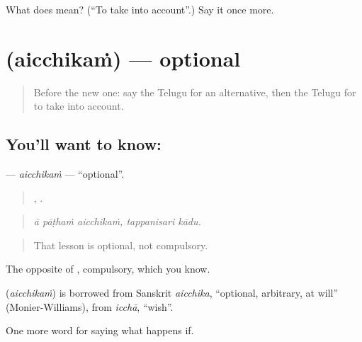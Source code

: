 \begin{tcolorbox}[breakable,colback=teal!4,colframe=teal!35!black,title={Before you move on}]
What does  mean? (\textquotedblleft{}To take into account\textquotedblright{}.) Say it once more.
\end{tcolorbox}
\section[\texorpdfstring{\te{ఐచ్ఛికం} (aicchikaṁ)}{ఐచ్ఛికం (aicchikaṁ)}]{ (aicchikaṁ) — optional}

\label{lesson:TE-C420-aicchikam}



\begin{quote}
Before the new one: say the Telugu for an alternative, then the Telugu for to take into account.
\end{quote}

\subsection*{You'll want to know: }
\textbf{} — \emph{aicchikaṁ} — \textquotedblleft{}optional\textquotedblright{}.

\begin{quote}
  ,  .
\end{quote}

\begin{quote}
\emph{ā pāṭhaṁ aicchikaṁ, tappanisari kādu.}
\end{quote}

\begin{quote}
That lesson is optional, not compulsory.
\end{quote}

The opposite of , compulsory, which you know.

\begin{cousinweb}
\textbf{} (\emph{aicchikaṁ}) is borrowed from Sanskrit \emph{aicchika}, \textquotedblleft{}optional, arbitrary, at will\textquotedblright{} (Monier-Williams), from \emph{icchā}, \textquotedblleft{}wish\textquotedblright{}.
\end{cousinweb}

\begin{grammarlens}[title={What you've built}]
One more word for saying what happens if.
\end{grammarlens}

